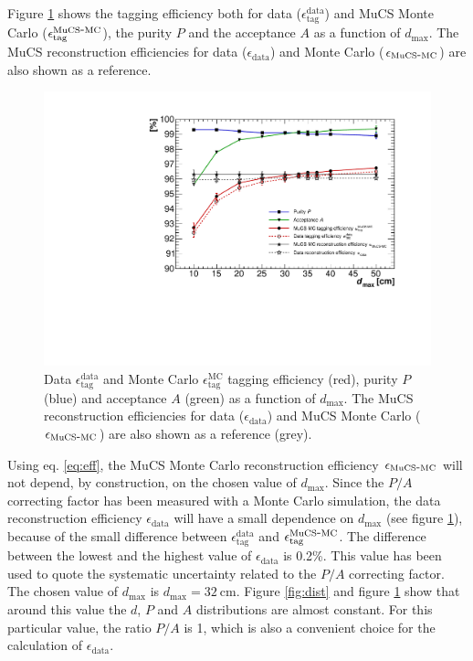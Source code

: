 \documentclass[a4paper,11pt]{article}
\def\myhyphen{{\hbox{-}}}
\begin{document}
Figure \ref{fig:purity} shows the tagging efficiency both for data ($\epsilon^{\mathrm{data}}_{\mathrm{tag}}$) and MuCS Monte Carlo  ($\epsilon^{\mathrm{MuCS\myhyphen MC}}_{\mathrm{tag}}$), the purity $P$ and the acceptance $A$ as a function of $d_{\mathrm{max}}$. The MuCS reconstruction efficiencies for data ($\epsilon_{\mathrm{data}}$) and Monte Carlo ($\epsilon_{\mathrm{MuCS\myhyphen MC}}$) are also shown as a reference.

\begin{figure}[htbp]
  \begin{center}
    \includegraphics[width=0.7\linewidth]{figures/purity.pdf}
    \caption{Data $\epsilon^{\mathrm{data}}_{\mathrm{tag}}$ and Monte Carlo $\epsilon^{\mathrm{MC}}_{\mathrm{tag}}$ tagging efficiency (red), purity $P$ (blue) and acceptance $A$ (green) as a function of $d_{\mathrm{max}}$. The MuCS reconstruction efficiencies for data ($\epsilon_{\mathrm{data}}$) and MuCS Monte Carlo ($\epsilon_{\mathrm{MuCS\myhyphen MC}}$) are also shown as a reference (grey).} \label{fig:purity}
  \end{center}
\end{figure}

Using eq. \eqref{eq:eff}, the MuCS Monte Carlo reconstruction efficiency $\epsilon_{\mathrm{MuCS\myhyphen MC}}$ will not depend, by construction, on the chosen value of $d_{\mathrm{max}}$. Since the $P/A$ correcting factor has been measured with a Monte Carlo simulation, the data reconstruction efficiency $\epsilon_{\mathrm{data}}$ will have a small dependence on $d_{\mathrm{max}}$ (see figure \ref{fig:purity}), because of the small difference between $\epsilon^{\mathrm{data}}_{\mathrm{tag}}$ and $\epsilon^{\mathrm{MuCS\myhyphen MC}}_{\mathrm{tag}}$.
The difference between the lowest and the highest value of $\epsilon_{\mathrm{data}}$ is 0.2\%. This value has been used to quote the systematic uncertainty related to the $P/A$ correcting factor.
The chosen value of $d_{\mathrm{max}}$ is $d_{\mathrm{max}}=32~\mathrm{cm}$. Figure \ref{fig:dist} and figure \ref{fig:purity} show that around this value the $d$, $P$ and $A$ distributions are almost constant. For this particular value,  the ratio $P/A$ is 1, which is also a convenient choice for the calculation of $\epsilon_{\mathrm{data}}$.
\end{document}
